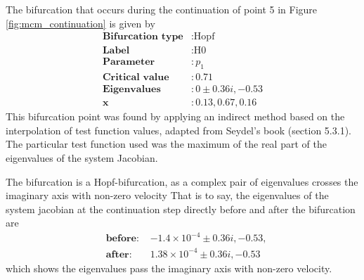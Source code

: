 The bifurcation that occurs during the continuation of point 5 in Figure \ref{fig:mcm_continuation} is given by
\begin{align*}
    \textbf{Bifurcation type} & : \text{Hopf} \\
    \textbf{Label} &: \text{H0} \\
    \textbf{Parameter} & : p_1 \\
    \textbf{Critical value} & : 0.71 \\
    \textbf{Eigenvalues} & : 0 \pm 0.36i, -0.53\\
    \mathbf{x}& : 0.13, 0.67, 0.16
\end{align*}
This bifurcation point was found by applying an indirect method based on the interpolation of test function values, adapted from 
Seydel's book (section 5.3.1). The particular test function used was the maximum of the real part of the eigenvalues of
the system Jacobian.

The bifurcation is a Hopf-bifurcation, as a complex pair of eigenvalues crosses the imaginary axis with non-zero velocity
That is to say, the eigenvalues of the system jacobian at the continuation step directly before and after the bifurcation are
\begin{align*}
    &\textbf{before: } &-1.4\times10^{-4} \pm 0.36i, -0.53,\\
    &\textbf{after: }  &1.38\times10^{-4} \pm 0.36i, -0.53	
\end{align*}
which shows the eigenvalues pass the imaginary axis with non-zero velocity.

